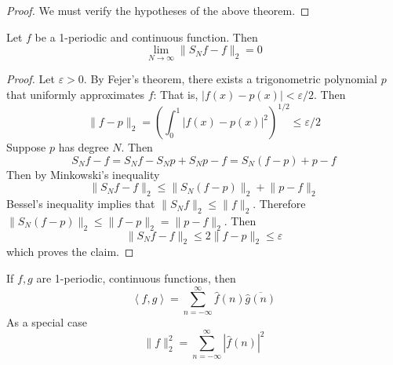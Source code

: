 \documentclass[11pt]{article}
\numberwithin{equation}{section}
\theoremstyle{definition}
\theoremstyle{definition}
\newcommand\parens[1]{\left( #1 \right)}
\newcommand\angles[1]{\left\langle #1 \right\rangle}
\newcommand\abs[1]{\left| #1 \right|}
\newcommand\norm[1]{\lVert#1\rVert}
\newcommand{\1}{\mathbbm 1}
\newcommand{\e}{\varepsilon}
\begin{document}
\begin{corollary}

\end{corollary}
\begin{proof}
	We must verify the hypotheses of the above theorem. 

\end{proof}

\begin{theorem}
	Let $f$ be a 1-periodic and continuous function. Then
	\begin{equation}
		\lim_{N \to \infty} \norm{S_N f - f}_2 = 0
	\end{equation}
\end{theorem}
\begin{proof}
	Let $\e > 0$. By Fejer's theorem, there exists a trigonometric polynomial $p$ that uniformly approximates $f$: That is, $|f(x) - p(x)| < \e/2$. Then
	\begin{equation}
		\norm{f - p}_2 = \parens{\int_0^1 \abs{f(x)-p(x)}^2}^{1/2} \leq \e/2
	\end{equation}
	Suppose $p$ has degree $N$. Then 
	\begin{equation}
		S_N f - f = S_N f - S_N p + S_N p - f = S_N (f - p) + p - f
	\end{equation}
	Then by Minkowski's inequality
	\begin{equation}
		\norm{S_N f - f}_2 \leq \norm{S_N (f - p)}_2 + \norm{p - f}_2
	\end{equation}
	Bessel's inequality implies that $\norm{S_N f}_2 \leq \norm{f}_2$. Therefore $\norm{S_N (f-p)}_2 \leq \norm{f-p}_2 = \norm{p-f}_2$. Then
	\begin{equation}
		\norm{S_N f - f}_2 \leq 2 \norm{f-p}_2 \leq \e
	\end{equation}
	which proves the claim. 	
\end{proof}

\begin{corollary}
	If $f,g$ are 1-periodic, continuous functions, then
	\begin{equation}
		\angles{f,g} = \sum_{n=-\infty}^\infty \hat{f}(n) \overline{\hat{g}(n)}
	\end{equation}
	As a special case
	\begin{equation}
		\norm{f}^2_2 = \sum_{n=-\infty}^\infty \abs{\hat{f}(n)}^2
	\end{equation}
\end{corollary}
\end{document}
